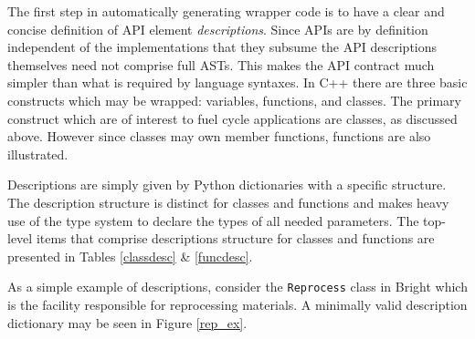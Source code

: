\documentclass{ansconfpaper}
\newcommand{\vin}[1]{\texttt{{#1}}}
\begin{document}
The first step in automatically generating wrapper code is to have a clear and 
concise definition of API element \emph{descriptions}.  Since APIs are by definition 
independent of the implementations that they subsume the API descriptions themselves
need not comprise full ASTs.  This makes the API contract much simpler than what
is required by language syntaxes.  In C++ there are three
basic constructs which may be wrapped: variables, functions, and classes.  
The primary construct which are of interest to fuel cycle applications are classes, 
as discussed above.  However since classes may own member functions, functions are
also illustrated.

Descriptions are simply given by Python dictionaries with a specific structure.
The description structure is distinct for classes and functions and makes heavy 
use of the type system to declare the types of all needed parameters.  The top-level
items that comprise descriptions structure for classes and functions are presented 
in Tables \ref{classdesc} \& \ref{funcdesc}.

As a simple example of descriptions, consider the \vin{Reprocess} class in Bright 
which is the facility responsible for reprocessing materials. A minimally valid 
description dictionary may be seen in Figure \ref{rep_ex}. 
\end{document}
